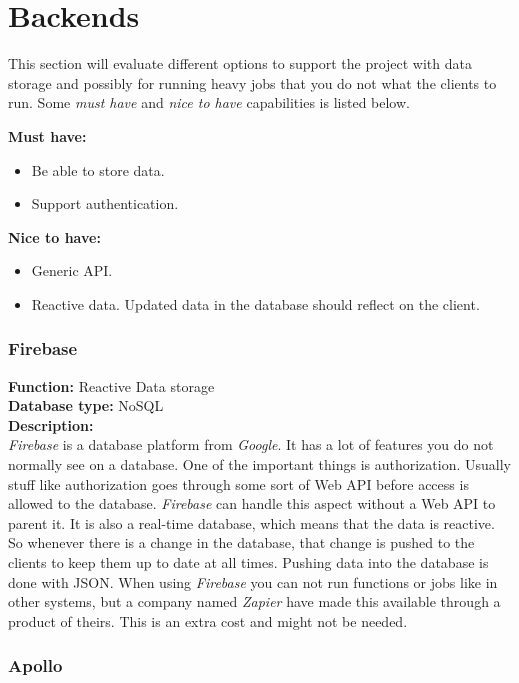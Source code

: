 \section{Backends}

This section will evaluate different options to support the project with data storage and possibly for running heavy jobs that you do not what the clients to run. Some \textit{must have} and \textit{nice to have} capabilities is listed below.
	
\textbf{Must have:}
	\begin{itemize}
	\item Be able to store data.
	\item Support authentication.
	\end{itemize}
	
\textbf{Nice to have:}
	
	\begin{itemize}
	\item Generic API.
	\item Reactive data. Updated data in the database should reflect on the client.
	\end{itemize}
	

\subsubsection{Firebase}

\textbf{Function:} Reactive Data storage
\\
\textbf{Database type:} NoSQL
\\
\textbf{Description:}
\\
\textit{Firebase} is a database platform from \textit{Google}. It has a lot of features you do not normally see on a database. One of the important things is authorization. Usually stuff like authorization goes through some sort of Web API before access is allowed to the database. \textit{Firebase} can handle this aspect without a Web API to parent it. It is also a real-time database, which means that the data is reactive. So whenever there is a change in the database, that change is pushed to the clients to keep them up to date at all times. Pushing data into the database is done with JSON. When using \textit{Firebase} you can not run functions or jobs like in other systems, but a company named \textit{Zapier} have made this available through a product of theirs. This is an extra cost and might not be needed.


\subsubsection{Apollo}

